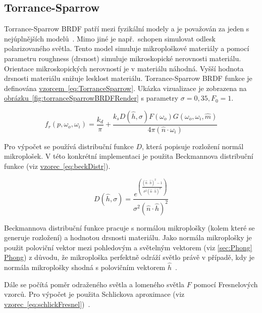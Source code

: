 \documentclass[czech,master]{diploma}
\newcommand{\uvec}[1]{\hat{#1}}
\newcommand{\point}{p}
\newcommand{\brdf}{f_r\left(\point,\omega_{o},\omega_{i}\right)}
\newcommand{\normVec}{\uvec{n}}
\newcommand{\normMicroVec}{\uvec{m}}
\newcommand{\inVec}{\omega_{i}}
\newcommand{\outVec}{\omega_{o}}
\newcommand{\halfVec}{\uvec{h}}
\newcommand{\rough}{\sigma}
\newcommand{\Fzero}{F_0}
\begin{document}
\subsection{Torrance-Sparrow} \label{sec:torrancesparrow}
Torrance-Sparrow BRDF patří mezi fyzikální modely a je považován za jeden s nejúplnějších modelů~\cite{BRDFOverview}. Mimo jiné je např.\ schopen simulovat odlesk polarizovaného světla. Tento model simuluje mikroploškové materiály a pomocí parametru roughness (drsnost) simuluje mikroskopické nerovnosti materiálu. Orientace mikroskopických nerovností je v materiálu náhodná. Vyšší hodnota drsnosti materiálu snižuje lesklost materiálu. Torrance-Sparrow BRDF funkce je definována \hyperref[eq:TorranceSparrow]{vzorcem~\ref{eq:TorranceSparrow}}. Ukázka vizualizace je zobrazena na \hyperref[fig:torranceSparrowBRDFRender]{obrázku~\ref{fig:torranceSparrowBRDFRender}} s parametry \(\rough=0{,}35, \Fzero = 1\).\par

\begin{equation}\label{eq:TorranceSparrow}
  \brdf  =  \frac{k_d}{\pi} + \frac{k_s D(\halfVec,\rough) F(\outVec) G(\outVec,\inVec, \normMicroVec)}{4\pi (\normVec \cdot \inVec)}
\end{equation}

Pro výpočet se používá distribuční funkce \(D\), která popisuje rozložení normál mikroplošek. V této konkrétní implementaci je použita Beckmannova distribuční funkce (viz \hyperref[eq:beckDistr]{vzorec~\ref{eq:beckDistr}}).

\begin{equation}\label{eq:beckDistr}
  D(\halfVec,\rough)  =  \frac{e^{\left(\frac{(\normVec\cdot \halfVec)^{2}-1}{\rough^{2}(\normVec \cdot \halfVec)^{2}}\right)}}{\rough^2(\normVec\cdot \halfVec)^{2}}
\end{equation}

Beckmannova distribuční funkce pracuje s normálou mikroplošky (kolem které se generuje rozložení) a hodnotou drsnosti materiálu. Jako normála mikroplošky je použit poloviční vektor mezi pohledovým a světelným vektorem (viz \hyperref[sec:Phong]{\ref{sec:Phong} Phong}) z důvodu, že mikroploška perfektně odráží světlo právě v případě, kdy je normála mikroplošky shodná s polovičním vektorem \(\halfVec\)~\cite{PHARR2017507}.\par
Dále se počítá poměr odraženého světla a lomeného světla \(F\) pomocí Fresnelových vzorců. Pro výpočet je použita Schlickova aproximace (viz \hyperref[eq:schlickFresnel]{vzorec~\ref{eq:schlickFresnel}})~\cite{SchlickFresnel}.
\end{document}
